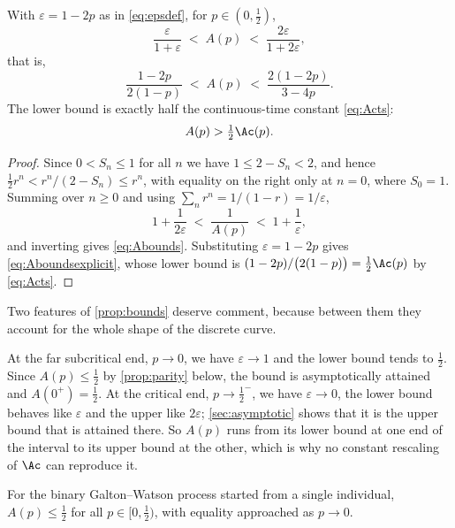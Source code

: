 \begin{proposition}
\label{prop:bounds}
With $\varepsilon=1-2p$ as in \cref{eq:epsdef}, for $p\in(0,\tfrac12)$,
\begin{equation}
\label{eq:Abounds}
\frac{\varepsilon}{1+\varepsilon} \;<\; A(p) \;<\; \frac{2\varepsilon}{1+2\varepsilon},
\end{equation}
that is,
\begin{equation}
\label{eq:Aboundsexplicit}
\frac{1-2p}{2(1-p)} \;<\; A(p) \;<\; \frac{2(1-2p)}{3-4p} .
\end{equation}
The lower bound is exactly half the continuous-time constant \cref{eq:Acts}:
\begin{equation}
\label{eq:halfAc}
A(p) > \tfrac12\Ac(p) .
\end{equation}
\end{proposition}

\begin{proof}
Since $0<S_n\le1$ for all $n$ we have $1\le2-S_n<2$, and hence
$\tfrac12r^n < r^n/(2-S_n)\le r^n$, with equality on the right only at $n=0$, where
$S_0=1$. Summing over $n\ge0$ and using $\sum_nr^n = 1/(1-r) = 1/\varepsilon$,
\begin{equation*}
1+\frac{1}{2\varepsilon} \;<\; \frac{1}{A(p)} \;<\; 1+\frac{1}{\varepsilon},
\end{equation*}
and inverting gives \cref{eq:Abounds}. Substituting $\varepsilon=1-2p$ gives
\cref{eq:Aboundsexplicit}, whose lower bound is
$(1-2p)/\bigl(2(1-p)\bigr) = \tfrac12\Ac(p)$ by \cref{eq:Acts}.
\end{proof}

Two features of \cref{prop:bounds} deserve comment, because between them they
account for the whole shape of the discrete curve.

At the far subcritical end, $p\to0$, we have $\varepsilon\to1$ and the lower bound
tends to $\tfrac12$. Since $A(p)\le\tfrac12$ by \cref{prop:parity} below, the bound
is asymptotically attained and $A(0^+)=\tfrac12$. At the critical end,
$p\to\tfrac12^-$, we have $\varepsilon\to0$, the lower bound behaves like
$\varepsilon$ and the upper like $2\varepsilon$; \cref{sec:asymptotic} shows that
it is the upper bound that is attained there. So $A(p)$ runs from its lower bound
at one end of the interval to its upper bound at the other, which is why no
constant rescaling of $\Ac$ can reproduce it.

\begin{proposition}
\label{prop:parity}
For the binary Galton--Watson process started from a single individual,
$A(p)\le\tfrac12$ for all $p\in[0,\tfrac12)$, with equality approached as $p\to0$.
\end{proposition}

